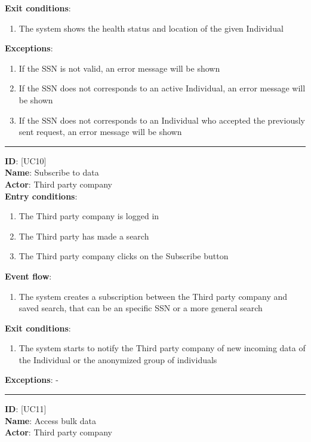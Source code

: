 \documentclass[12pt]{article}
\newcommand\usecase[1]{ [UC#1] }
\begin{document}
\begin{itemize}
\begin{enumerate}
  		\end{enumerate}
  	\textbf{Exit conditions}:
  		\begin{enumerate}
    			\item{The system shows the health status and location of the given Individual}
  		\end{enumerate}
  	\textbf{Exceptions}: 
  		\begin{enumerate}
    			\item{If the SSN is not valid, an error message will be shown}
    			\item{If the SSN does not corresponds to an active Individual, an error message will be shown}
    			\item{If the SSN does not corresponds to an Individual who accepted the previously sent request, an error message will be shown}
  		\end{enumerate}
  	\rule{\linewidth}{0.4pt}
  	\textbf{ID}: \usecase{10} \\
  	\textbf{Name}: Subscribe to data \\
    \textbf{Actor}: Third party company \\
    \textbf{Entry conditions}:
    		\begin{enumerate}
    			\item{The Third party company is logged in}
    			\item{The Third party has made a search}
    			\item{The Third party company clicks on the Subscribe button}
  		\end{enumerate}
  	\textbf{Event flow}:
  		\begin{enumerate}
    			\item{The system creates a subscription between the Third party company and saved search, that can be an specific SSN or a more general search}
  		\end{enumerate}
  	\textbf{Exit conditions}:
  		\begin{enumerate}
    			\item{The system starts to notify the Third party company of new incoming data of the Individual or the anonymized group of individuals}
  		\end{enumerate}
  	\textbf{Exceptions}:  - \\
  	\rule{\linewidth}{0.4pt}
  	\textbf{ID}: \usecase{11} \\
  	\textbf{Name}: Access bulk data \\
    \textbf{Actor}: Third party company \\

\end{itemize}
\end{document}
